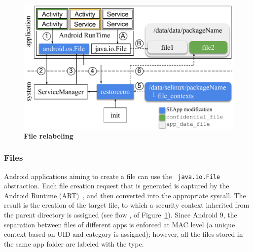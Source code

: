 \begin{figure}[t]
  \begin{center}
    \includegraphics[width=0.8\columnwidth]{chapters/seapp/figs/restorecon_service}
  \end{center}
  \caption{\label{fig:seapp_restorecon}\bf File relabeling}
\end{figure}


\subsubsection{Files}\label{sect:seapp_impl_files}

Android applications aiming to create a file can use the {\tt
  java.io.File} abstraction.  Each file creation request that is
generated is captured by the Android Runtime
(ART)~\cite{seapp_androruntime}, and then converted into the
appropriate syscall.  The result is the creation of the target file,
to which a security context inherited from the parent directory is
assigned (see flow ,  of
Figure~\ref{fig:seapp_restorecon}).  Since Android 9, the separation
between files of different apps is enforced at MAC level (a unique
context based on UID and \sel category is assigned); however, all the
files stored in the same app folder are labeled with the \appdatafile
type.

